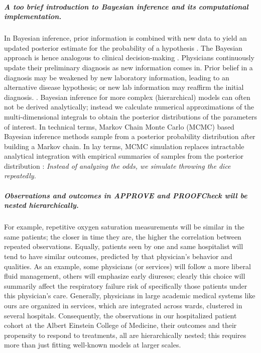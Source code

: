 \documentclass[11pt,notitlepage]{article}
\begin{document}
\subparagraph*{A too brief introduction to Bayesian inference and its computational implementation.}
In Bayesian inference, prior information is combined with new data to yield an updated posterior estimate for the probability of a hypothesis \cite{Kruschke_Book_2014}. The Bayesian approach is hence analogous to clinical decision-making \cite{Spiegelhalter_11134920}. Physicians continuously update their preliminary diagnosis as new information comes in. Prior belief in a diagnosis may be weakened by new laboratory information, leading to an alternative disease hypothesis; or new lab information may reaffirm the initial diagnosis. \cite{Kruschke_22774788}. Bayesian inference for more complex (hierarchical) models can often not be derived analytically; instead we calculate numerical approximations of the multi-dimensional integrals to obtain the posterior distributions of the parameters of interest. In technical terms, Markov Chain Monte Carlo (MCMC) based Bayesian inference methods sample from a posterior probability distribution after building a Markov chain. In lay terms, MCMC simulation replaces intractable analytical integration with empirical summaries of samples from the posterior distribution \cite{Abrams_9483729}: \textit{Instead of analyzing the odds, we simulate throwing the dice repeatedly.}

\subparagraph{Observations and outcomes in APPROVE and PROOFCheck will be nested hierarchically.}
For example, repetitive oxygen saturation measurements will be similar in the same patients; the closer in time they are, the higher the correlation between repeated observations. Equally, patients seen by one and same hospitalist will tend to have similar outcomes, predicted by that physician's behavior and qualities. As an example, some physicians (or services) will follow a more liberal fluid management, others will emphasize early diureses; clearly this choice will summarily affect the respiratory failure risk of specifically those patients under this physician's care. Generally, physicians in large academic medical systems like ours are organized in services, which are integrated across wards, clustered in several hospitals. Consequently, the observations in our hospitalized patient cohort at the Albert Einstein College of Medicine, their outcomes and their propensity to respond to treatments, all are hierarchically nested; this requires more than just fitting well-known models at larger scales. 
\end{document}
